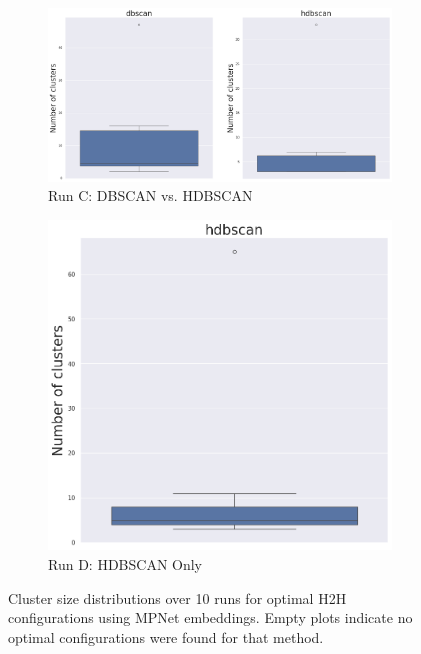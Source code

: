 \documentclass[10pt,oneside]{report}
\begin{document}
\begin{figure}[H]
    \ContinuedFloat
    \centering
    \begin{subfigure}[b]{\textwidth}
        \centering
        \includegraphics[width=\textwidth]{./images/mpnet_dbscanvshdbscan_whisker.png}
        \caption{Run C: DBSCAN vs. HDBSCAN}\label{fig:mpnet_h2h_runc}
    \end{subfigure}
    \hfill
    \begin{subfigure}[b]{0.48\textwidth}
        \centering
        \includegraphics[width=\textwidth]{./images/mpnet_hdbscan_whisker.png}
        \caption{Run D: HDBSCAN Only}\label{fig:mpnet_h2h_rund}
    \end{subfigure}
    \caption{Cluster size distributions over 10 runs for optimal H2H configurations using MPNet embeddings. Empty plots indicate no optimal configurations were found for that method.}
    \label{fig:mpnet_h2h_whisker_appendix}
\end{figure}
\end{document}
